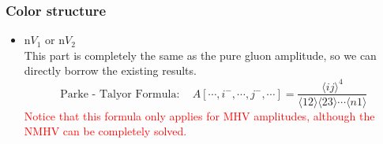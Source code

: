 \documentclass{beamer}
\newcommand{\avg}[1]{\langle #1 \rangle}
\begin{document}
\begin{frame}
    \frametitle{Color structure}
    \begin{itemize}
        \item n$ V_1$ or n$V_2$\\
        This part is completely the same as the pure gluon amplitude, so we can directly borrow the
        existing results.
        \begin{equation*}
            \boxed{\text{Parke - Talyor Formula}:\quad A[\cdots,i^-,\cdots,j^-,\cdots]=\frac{\avg{ij}^4}{\avg{12}\!\avg{23}\cdots\avg{n1}}}
        \end{equation*}
        \textcolor{red}{Notice that this formula only applies for MHV amplitudes, although the NMHV can be completely solved.}
    \end{itemize}
\end{frame}
\end{document}
